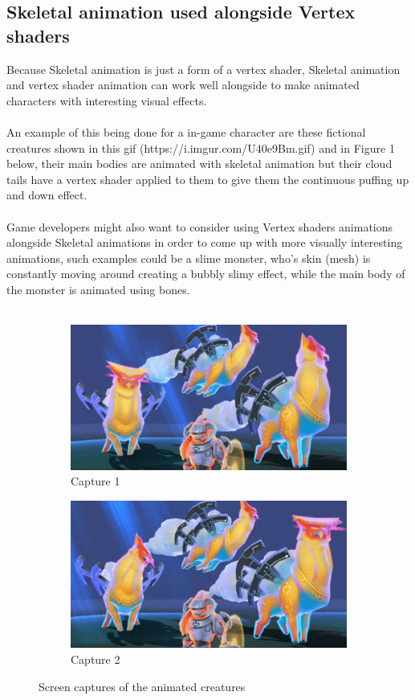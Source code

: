 \documentclass{scrartcl}
\begin{document}
\subsection{Skeletal animation used alongside Vertex shaders}
Because Skeletal animation is just a form of a vertex shader, Skeletal animation and vertex shader animation can work well alongside to make animated characters with interesting visual effects.
\\~\\
An example of this being done for a in-game character are these fictional creatures shown in this gif (https://i.imgur.com/U40e9Bm.gif) and in Figure 1 below, their main bodies are animated with skeletal animation but their cloud tails have a vertex shader applied to them to give them the continuous puffing up and down effect.
\\~\\
Game developers might also want to consider using Vertex shaders animations alongside Skeletal animations in order to come up with more visually interesting animations, such examples could be a slime monster, who's skin (mesh) is constantly moving around creating a bubbly slimy effect, while the main body of the monster is animated using bones.
\\~\\
\begin{figure}[h!]
  \centering
  \begin{subfigure}[b]{0.4\linewidth}
    \includegraphics[width=\linewidth]{Capture1.jpg}
    \caption{Capture 1}
  \end{subfigure}
  \begin{subfigure}[b]{0.4\linewidth}
    \includegraphics[width=\linewidth]{Capture2.jpg}
    \caption{Capture 2}
  \end{subfigure}
  \caption{Screen captures of the animated creatures}
  \label{fig:anim}
\end{figure}
\end{document}
